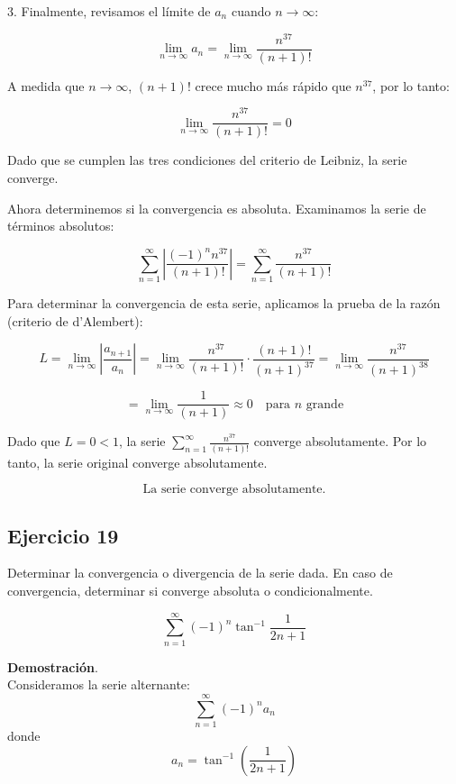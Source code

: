 \documentclass{article}
\begin{document}
    3. Finalmente, revisamos el límite de $a_n$ cuando $n \to \infty$:

    \[
    \lim\limits_{n \to \infty} a_n = \lim\limits_{n \to \infty} \frac{n^{37}}{(n+1)!}
    \]

    A medida que $n \to \infty$, $(n+1)!$ crece mucho más rápido que $n^{37}$, por lo tanto:

    \[
    \lim\limits_{n \to \infty} \frac{n^{37}}{(n+1)!} = 0
    \]

    Dado que se cumplen las tres condiciones del criterio de Leibniz, la serie converge.

    Ahora determinemos si la convergencia es absoluta. Examinamos la serie de términos absolutos:

    \[
    \sum_{n=1}^{\infty} \left| \frac{(-1)^{n} n^{37}}{(n+1)!} \right| = \sum_{n=1}^{\infty} \frac{n^{37}}{(n+1)!}
    \]

    Para determinar la convergencia de esta serie, aplicamos la prueba de la razón (criterio de d'Alembert):

    \[
    L = \lim\limits_{n \to \infty} \left| \frac{a_{n+1}}{a_n} \right| = \lim\limits_{n \to \infty} \frac{n^{37}}{(n+1)!} \cdot \frac{(n+1)!}{(n+1)^{37}} = \lim\limits_{n \to \infty} \frac{n^{37}}{(n+1)^{38}}
    \]

    \[
    = \lim\limits_{n \to \infty} \frac{1}{(n+1)} \approx 0 \quad \text{para $n$ grande}
    \]

    Dado que $L = 0 < 1$, la serie $\sum_{n=1}^{\infty} \frac{n^{37}}{(n+1)!}$ converge absolutamente. Por lo tanto, la serie original converge absolutamente.

    \[
    \text{La serie converge absolutamente.}
    \]



    \subsection*{Ejercicio 19}

    Determinar la convergencia o divergencia de la serie dada. En caso de convergencia, determinar si converge absoluta o condicionalmente.

    $$
    \sum_{n=1}^{\infty}(-1)^{n} \tan^{-1} \frac{1}{2n+1}
    $$

    \textbf{Demostración}.\\

    Consideramos la serie alternante:
    $$
    \sum_{n=1}^{\infty}(-1)^{n}a_{n}
    $$
    donde
    $$
    a_{n} = \tan^{-1}\left(\frac{1}{2n+1}\right)
    $$
\end{document}
